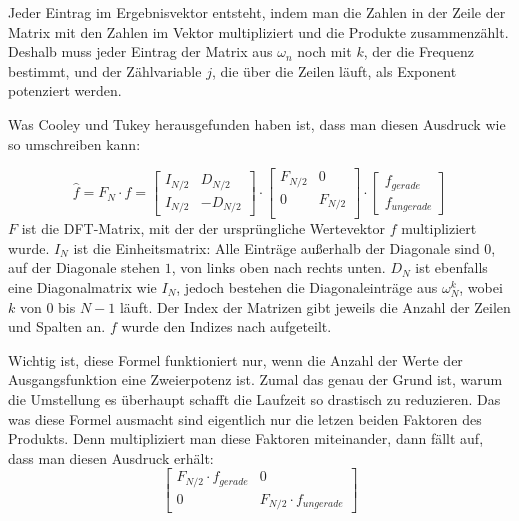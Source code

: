 \documentclass[a4paper,12pt]{article}
\theoremstyle{definition}
\theoremstyle{remark}
\begin{document}
Jeder Eintrag im Ergebnisvektor entsteht, indem man die Zahlen in der Zeile der Matrix 
mit den Zahlen im Vektor multipliziert und die Produkte zusammenzählt. Deshalb muss 
jeder Eintrag der Matrix aus $\omega_n$ noch mit $k$, der die Frequenz bestimmt, und 
der Zählvariable $j$, die über die Zeilen läuft, als Exponent potenziert werden.

Was Cooley und Tukey herausgefunden haben ist, dass man diesen Ausdruck wie so umschreiben 
kann:

\[\hat{f} = F_N \cdot f = 
\begin{bmatrix}
I_{N/2} & D_{N/2} \\
I_{N/2} & -D_{N/2}
\end{bmatrix}
\cdot 
\begin{bmatrix}
F_{N/2} & 0 \\
0 & F_{N/2} \\ 
\end{bmatrix}
\cdot 
\begin{bmatrix}
f_{gerade} \\
f_{ungerade}
\end{bmatrix}
\]
$F$ ist die DFT-Matrix, mit der der ursprüngliche Wertevektor $f$ multipliziert wurde. 
$I_N$ ist die Einheitsmatrix: Alle Einträge außerhalb der Diagonale sind $0$, auf der 
Diagonale stehen $1$, von links oben nach rechts unten. $D_N$ ist ebenfalls eine Diagonalmatrix 
wie $I_N$, jedoch bestehen die Diagonaleinträge aus $\omega_N^k$, wobei $k$ von $0$ bis $N-1$ 
läuft. Der Index der Matrizen gibt jeweils die Anzahl der Zeilen und Spalten an. $f$ wurde den Indizes nach aufgeteilt. 

Wichtig ist, diese Formel funktioniert nur, wenn die Anzahl der Werte der Ausgangsfunktion 
eine Zweierpotenz ist. Zumal das genau der Grund ist, warum die Umstellung es überhaupt schafft die Laufzeit 
so drastisch zu reduzieren. Das was diese Formel ausmacht sind eigentlich nur die letzen beiden 
Faktoren des Produkts. Denn multipliziert man diese Faktoren miteinander, dann fällt auf, dass 
man diesen Ausdruck erhält:
\[
\begin{bmatrix}
F_{N/2} \cdot f_{gerade} & 0 \\
0 & F_{N/2} \cdot f_{ungerade} 
\end{bmatrix}
\]
\end{document}
